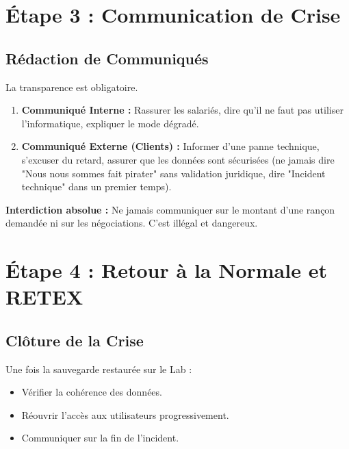 \section{Étape 3 : Communication de Crise}

\subsection{Rédaction de Communiqués}

La transparence est obligatoire.

\begin{enumerate}
    \item \textbf{Communiqué Interne :} Rassurer les salariés, dire qu'il ne faut pas utiliser l'informatique, expliquer le mode dégradé.
    \item \textbf{Communiqué Externe (Clients) :} Informer d'une panne technique, s'excuser du retard, assurer que les données sont sécurisées (ne jamais dire "Nous nous sommes fait pirater" sans validation juridique, dire "Incident technique" dans un premier temps).
\end{enumerate}

\begin{boxalert}
\textbf{Interdiction absolue :} Ne jamais communiquer sur le montant d'une rançon demandée ni sur les négociations. C'est illégal et dangereux.
\end{boxalert}

\section{Étape 4 : Retour à la Normale et RETEX}

\subsection{Clôture de la Crise}

Une fois la sauvegarde restaurée sur le Lab :
\begin{itemize}
    \item Vérifier la cohérence des données.
    \item Réouvrir l'accès aux utilisateurs progressivement.
    \item Communiquer sur la fin de l'incident.
\end{itemize}


